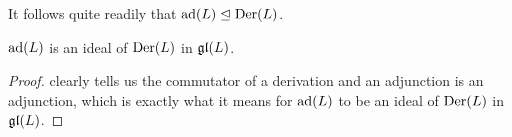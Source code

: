 It follows quite readily that $\operatorname{ad}\!\left( L \right) \trianglelefteq \operatorname{Der}\!\left( L \right)$.

\begin{boxcorollary}
    $\operatorname{ad}\!\left( L \right)$ is an ideal of $\operatorname{Der}\!\left( L \right)$ in $\mathfrak{gl}\!\left( L \right)$.
\end{boxcorollary}
\begin{proof}
     clearly tells us the commutator of a derivation and an adjunction is an adjunction, which is exactly what it means for $\operatorname{ad}\!\left( L \right)$ to be an ideal of $\operatorname{Der}\!\left( L \right)$ in $\mathfrak{gl}\!\left( L \right)$.
    \begin{comment}
    derivation. To that end, fix $x, y \in L$. We need to show that
    \begin{align}
        \brac{D, \pad{\ell}}\of{\brac{x, y}} = \brac{x, \brac{D, \pad{\ell}}\of{y}} + \brac{\brac{D, \pad{\ell}}\of{x}, y}
        \label{Ch1:Eq:ad_ideal_der}
    \end{align}
    Indeed, we have that
    \begin{align}
        \brac{D, \pad{\ell}}\of{\brac{x, y}}
        &= \parenth{D \circ \pad{\ell} - \pad{\ell} \circ D}\of{\brac{x, y}} \nonumber \\
        &= D\of{\pad{\ell}\of{\brac{x, y}}} - \pad{\ell}\of{D\of{\brac{x, y}}} \nonumber \\
        &= D\of{\brac{\ell, \brac{x, y}}} - \brac{\ell, D\of{\brac{x, y}}} \nonumber \\
        &= \brac{\ell, D\of{\brac{x, y}}} + \brac{D\of{\ell}, \brac{x, y}} - \brac{\ell, D\of{\brac{x, y}}} \nonumber \\
        &= \brac{D\of{\ell}, \brac{x, y}} \label{Ch1:Eq:ad_ideal_der_LHS}
    \end{align}
    Similarly, bearing in mind that $\brac{D, \pad{\ell}}$ is the commutator in $\gl{L}$, we have
    \begin{align}
        \brac{x, \brac{D, \pad{\ell}}\of{y}} + \brac{\brac{D, \pad{\ell}}\of{x}, y}
        =& \brac{x, D\of{\pad{\ell}\of{y}} - \pad{\ell}\of{D\of{y}}} \nonumber \\

\end{comment}
\end{proof}
